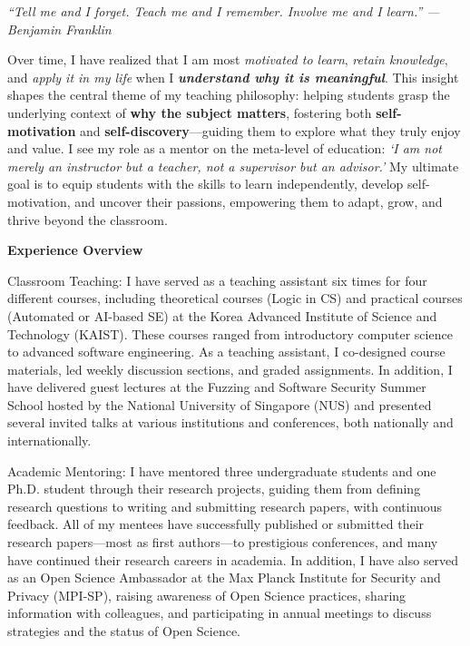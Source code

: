 \documentclass{article}
\begin{document}
\thispagestyle{firstpage} %

\noindent \emph{``Tell me and I forget. Teach me and I remember. Involve me and I learn.'' \hfill--- Benjamin Franklin}

\vspace{.5em}
Over time, I have realized that I am most \emph{motivated to learn}, \emph{retain knowledge}, and \emph{apply it in my life} when I \textbf{\emph{understand why it is meaningful}}.
This insight shapes the central theme of my teaching philosophy: helping students grasp the underlying context of \textbf{why the subject matters}, fostering both \textbf{self-motivation} and \textbf{self-discovery}—guiding them to explore what they truly enjoy and value. I see my role as a mentor on the meta-level of education: \emph{`I am not merely an instructor but a teacher, not a supervisor but an advisor.'} My ultimate goal is to equip students with the skills to learn independently, develop self-motivation, and uncover their passions, empowering them to adapt, grow, and thrive beyond the classroom.

\vspace{.5em}\noindent\textbf{Experience Overview}\vspace{.5em}

\noindent Classroom Teaching: I have served as a teaching assistant six times for four different courses, including theoretical courses (Logic in CS) and practical courses (Automated or AI-based SE) at the Korea Advanced Institute of Science and Technology (KAIST). These courses ranged from introductory computer science to advanced software engineering. As a teaching assistant, I co-designed course materials, led weekly discussion sections, and graded assignments.
In addition, I have delivered guest lectures at the Fuzzing and Software Security Summer School hosted by the National University of Singapore (NUS) and presented several invited talks at various institutions and conferences, both nationally and internationally.

\vspace{0.5em}
\noindent Academic Mentoring:  I have mentored three undergraduate students and one Ph.D. student through their research projects, guiding them from defining research questions to writing and submitting research papers, with continuous feedback. All of my mentees have successfully published or submitted their research papers—most as first authors—to prestigious conferences, and many have continued their research careers in academia. In addition, I have also served as an Open Science Ambassador at the Max Planck Institute for Security and Privacy (MPI-SP), raising awareness of Open Science practices, sharing information with colleagues, and participating in annual meetings to discuss strategies and the status of Open Science.
\end{document}
